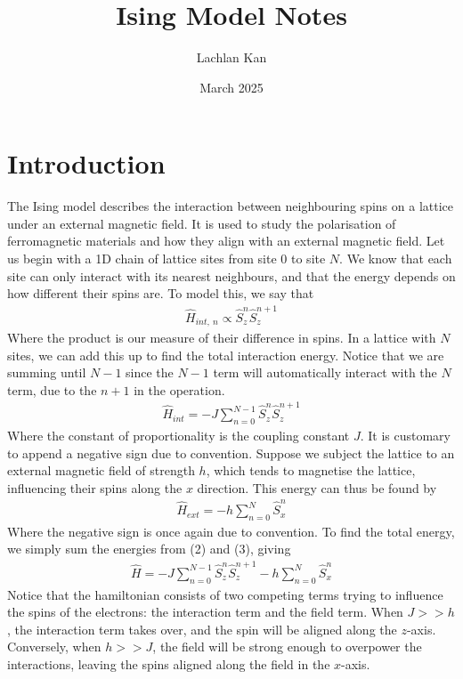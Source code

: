 \documentclass{article}
\title{Ising Model Notes}
\author{Lachlan Kan}
\date{March 2025}
\begin{document}
\maketitle
\section{Introduction}
The Ising model describes the interaction between neighbouring spins on a lattice
under an external magnetic field. It is used to study the polarisation of ferromagnetic 
materials and how they align with an external magnetic field. Let us begin with 
a 1D chain of lattice sites from site 0 to site $N$. We know that each site can only interact with its nearest neighbours, and that 
the energy depends on how different their spins are. To model this, we say that 
\begin{align}
    \hat{H}_{int,\ n}\propto\hat{S}_z^n \hat{S}_z^{n+1}
\end{align}
Where the product is our measure of their difference in spins. In a lattice with $N$ sites, we can add this up to find 
the total interaction energy. Notice that we are summing until $N-1$ since the $N-1$ term will automatically 
interact with the $N$ term, due to the $n+1$ in the operation. 
\begin{align}
    \hat{H}_{int}=-J\sum_{n=0}^{N-1}\hat{S}_z^n \hat{S}_z^{n+1}
\end{align}
Where the constant of proportionality is the coupling constant $J$. It is customary to append a negative sign due to convention. 
Suppose we subject the lattice to an external magnetic field of strength $h$, which tends to 
magnetise the lattice, influencing their spins along the $x$ direction. This energy can thus be 
found by 
\begin{align}
    \hat{H}_{ext}=-h\sum_{n=0}^N\hat{S}_x^n
\end{align}
Where the negative sign is once again due to convention. 
To find the total energy, we simply sum the energies from (2) and (3), giving 
\begin{align}
    \hat{H}=-J\sum_{n=0}^{N-1}\hat{S}_z^n \hat{S}_z^{n+1}-h\sum_{n=0}^N\hat{S}_x^n
\end{align}
Notice that the hamiltonian consists of two competing terms trying to influence the spins of the electrons: the interaction term and the field term. 
When $J>>h$, the interaction term takes over, 
and the spin will be aligned along the $z$-axis. Conversely, when 
$h>>J$, the field will be strong enough to overpower the interactions, 
leaving the spins aligned 
along the field in the $x$-axis. 
\end{document}
